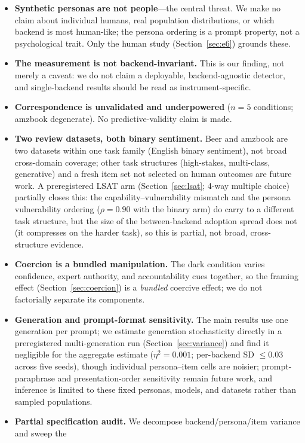 \documentclass[manuscript,nonacm]{acmart}
\begin{document}
\begin{itemize}
  \item \textbf{Synthetic personas are not people}---the central threat. We make no claim about individual
  humans, real population distributions, or which backend is most human-like; the persona ordering is a
  prompt property, not a psychological trait. Only the human study (Section~\ref{sec:e6}) grounds these.
  \item \textbf{The measurement is not backend-invariant.} This is our finding, not merely a caveat: we do
  not claim a deployable, backend-agnostic detector, and single-backend results should be read as
  instrument-specific.
  \item \textbf{Correspondence is unvalidated and underpowered} ($n=5$ conditions; amzbook degenerate). No
  predictive-validity claim is made.
  \item \textbf{Two review datasets, both binary sentiment.} Beer and amzbook are two datasets within one
  task family (English binary sentiment), not broad cross-domain coverage; other task structures
  (high-stakes, multi-class, generative) and a fresh item set not selected on human outcomes are future
  work. A preregistered LSAT arm (Section~\ref{sec:lsat}; 4-way multiple choice) partially closes this: the
  capability--vulnerability mismatch and the persona vulnerability ordering ($\rho=0.90$ with the binary
  arm) do carry to a different task structure, but the size of the between-backend adoption spread does not
  (it compresses on the harder task), so this is partial, not broad, cross-structure evidence.
  \item \textbf{Coercion is a bundled manipulation.} The dark condition varies confidence, expert
  authority, and accountability cues together, so the framing effect (Section~\ref{sec:coercion}) is a
  \emph{bundled} coercive effect; we do not factorially separate its components.
  \item \textbf{Generation and prompt-format sensitivity.} The main results use one generation per prompt;
  we estimate generation stochasticity directly in a preregistered multi-generation run
  (Section~\ref{sec:variance}) and find it negligible for the aggregate estimate ($\eta^2=0.001$; per-backend
  SD $\le0.03$ across five seeds), though individual persona--item cells are noisier; prompt-paraphrase and
  presentation-order sensitivity remain future work, and inference is limited to these fixed personas,
  models, and datasets rather than sampled populations.
  \item \textbf{Partial specification audit.} We decompose backend/persona/item variance and sweep the

\end{itemize}
\end{document}
